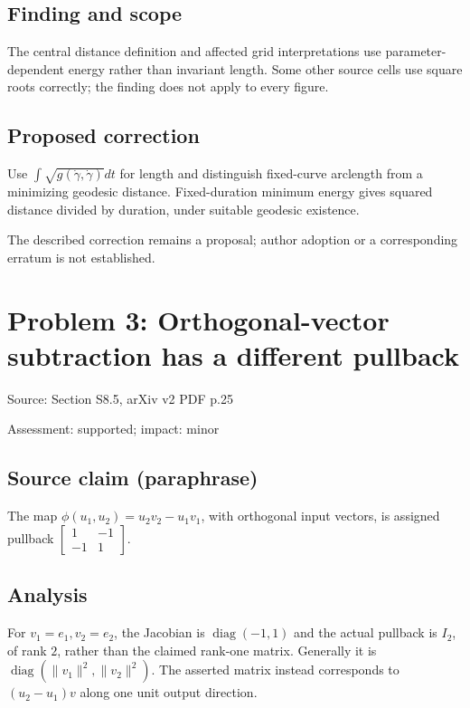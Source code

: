 \documentclass[11pt]{article}
\begin{document}
\subsection*{Finding and scope}

The central distance definition and affected grid interpretations use parameter-dependent energy rather than invariant length. Some other source cells use square roots correctly; the finding does not apply to every figure.

\subsection*{Proposed correction}

Use \(\int\sqrt{g(\dot\gamma,\dot\gamma)}dt\) for length and distinguish fixed-curve arclength from a minimizing geodesic distance. Fixed-duration minimum energy gives squared distance divided by duration, under suitable geodesic existence.

The described correction remains a proposal; author adoption or a corresponding erratum is not established.

\section*{Problem 3: Orthogonal-vector subtraction has a different pullback}

Source: Section S8.5, arXiv v2 PDF p.25

Assessment: supported; impact: minor

\subsection*{Source claim (paraphrase)}

The map \(\phi(u_1,u_2)=u_2v_2-u_1v_1\), with orthogonal input vectors, is assigned pullback \(\left[\begin{smallmatrix}1&-1\\-1&1\end{smallmatrix}\right]\).

\subsection*{Analysis}

For \(v_1=e_1,v_2=e_2\), the Jacobian is \(\operatorname{diag}(-1,1)\) and the actual pullback is \(I_2\), of rank \(2\), rather than the claimed rank-one matrix. Generally it is \(\operatorname{diag}(\|v_1\|^2,\|v_2\|^2)\). The asserted matrix instead corresponds to \((u_2-u_1)v\) along one unit output direction.
\end{document}
